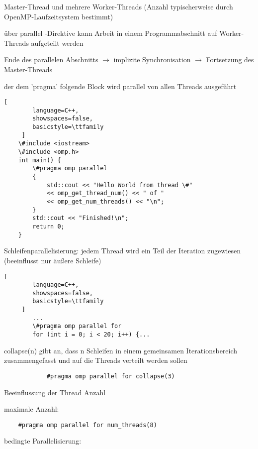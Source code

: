 \documentclass[10pt]{article}
\begin{document}
\begin{itemize*}
  \item Master-Thread und mehrere Worker-Threads (Anzahl typischerweise durch OpenMP-Laufzeitsystem bestimmt)
  \item über parallel -Direktive kann Arbeit in einem Programmabschnitt auf Worker-Threads aufgeteilt werden
  \item Ende des parallelen Abschnitts $\rightarrow$ implizite Synchronisation $\rightarrow$ Fortsetzung des Master-Threads
  \item der dem 'pragma' folgende Block wird parallel von allen Threads ausgeführt
  \begin{lstlisting}[
        language=C++,
        showspaces=false,
        basicstyle=\ttfamily
     ]
    \#include <iostream>
    \#include <omp.h>
    int main() {
        \#pragma omp parallel
        {
            std::cout << "Hello World from thread \#"
            << omp_get_thread_num() << " of "
            << omp_get_num_threads() << "\n";
        }
        std::cout << "Finished!\n";
        return 0;
    }
    \end{lstlisting}
  \item Schleifenparallelisierung: jedem Thread wird ein Teil der Iteration zugewiesen (beeinflusst nur äußere Schleife)
  \begin{lstlisting}[
        language=C++,
        showspaces=false,
        basicstyle=\ttfamily
     ]
        ...
        \#pragma omp parallel for
        for (int i = 0; i < 20; i++) {...
    \end{lstlisting}
  \begin{itemize*}
    \item collapse(n) gibt an, dass n Schleifen in einem gemeinsamen Iterationsbereich zusammengefasst und auf die Threads verteilt werden sollen
    \begin{lstlisting}
            #pragma omp parallel for collapse(3)
        \end{lstlisting}
  \end{itemize*}
  \item Beeinflussung der Thread Anzahl
  \begin{itemize*}
    \item maximale Anzahl:
    \begin{lstlisting}
    #pragma omp parallel for num_threads(8)
\end{lstlisting}
    \item bedingte Parallelisierung:
    \begin{lstlisting}

\end{lstlisting}
\end{itemize*}
\end{itemize*}
\end{document}
